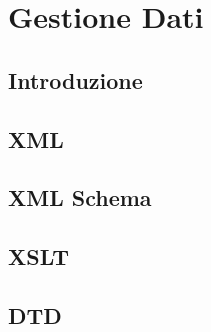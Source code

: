 \section{Gestione Dati}{
	\subsection{Introduzione}
	\subsection{XML}
	\subsection{XML Schema}
	\subsection{XSLT}
	\subsection{DTD}
}